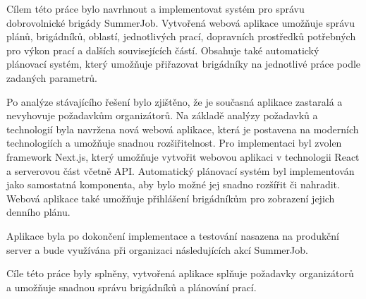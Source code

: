 \begin{conclusion}
	Cílem této práce bylo navrhnout a implementovat systém pro správu dobrovolnické brigády SummerJob.
	Vytvořená webová aplikace umožňuje správu plánů, brigádníků, oblastí, jednotlivých prací, dopravních prostředků potřebných pro výkon prací a dalších souvisejících částí.
	Obsahuje také automatický plánovací systém, který umožňuje přiřazovat brigádníky na jednotlivé práce podle zadaných parametrů.

	Po analýze stávajícího řešení bylo zjištěno, že je současná aplikace zastaralá a nevyhovuje požadavkům organizátorů.
	Na základě analýzy požadavků a technologií byla navržena nová webová aplikace, která je postavena na moderních technologiích a umožňuje snadnou rozšiřitelnost.
	Pro implementaci byl zvolen framework Next.js, který umožňuje vytvořit webovou aplikaci v technologii React a serverovou část včetně API.
	Automatický plánovací systém byl implementován jako samostatná komponenta, aby bylo možné jej snadno rozšířit či nahradit.
	Webová aplikace také umožňuje přihlášení brigádníkům pro zobrazení jejich denního plánu.

	Aplikace byla po dokončení implementace a testování nasazena na produkční server a bude využívána při organizaci následujících akcí SummerJob.

	Cíle této práce byly splněny, vytvořená aplikace splňuje požadavky organizátorů a umožňuje snadnou správu brigádníků a plánování prací.

\end{conclusion}
